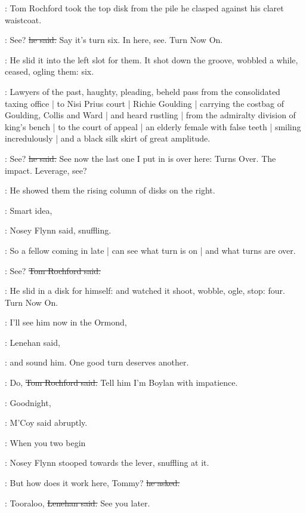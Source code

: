 :
Tom Rochford took the top disk from the pile
he clasped against his claret waistcoat.

\rochford:
See?
\sout{he said.}
Say it's turn six.
In here, see.
Turn Now On.

:
He slid it into the left slot for them.
It shot down the groove,
wobbled a while,
ceased,
ogling them:
six.

\begin{interject}
    :
    Lawyers of the past, haughty, pleading,
    beheld pass from the consolidated taxing office |
    to Nisi Prius court |
    Richie Goulding |
    carrying the costbag of Goulding, Collis and Ward |
    and heard rustling |
    from the admiralty division of king's bench |
    to the court of appeal |
    an elderly female with false teeth |
    smiling incredulously |
    and a black silk skirt of great amplitude.
\end{interject}

\rochford:
See?
\sout{he said.}
See now the last one I put in is over here:
Turns Over.
The impact. Leverage, see?

:
He showed them the rising column of disks on the right.

\nosey:
Smart idea,

:
Nosey Flynn said, snuffling.

\nosey:
So a fellow coming in late |
can see what turn is on |
and what turns are over.

\rochford:
See?
\sout{Tom Rochford said.}

:
He slid in a disk for himself:
and watched it
shoot,
wobble,
ogle,
stop:
four.
Turn Now On.

\lenehan:
I'll see him now in the Ormond,

:
Lenehan said,

\lenehan:
and sound him.
One good turn deserves another.

\rochford:
Do,
\sout{Tom Rochford said.}
Tell him I'm Boylan with impatience.

\mcoy:
Goodnight,

:
M'Coy said abruptly.

\mcoy:
When you two begin

:
Nosey Flynn stooped towards the lever,
snuffling at it.

\nosey:
But how does it work here, Tommy?
\sout{he asked.}

\lenehan:
Tooraloo,
\sout{Lenehan said.}
See you later.

